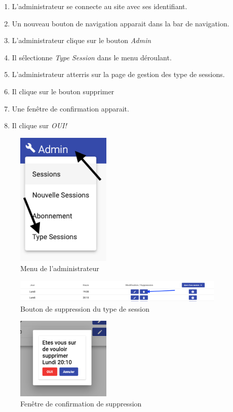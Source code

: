 \begin{enumerate}
	\item L'administrateur se connecte au site avec ses identifiant. 
	\item Un nouveau bouton de navigation apparait dans la bar de navigation. 
	\item L'administrateur clique sur le bouton \textit{Admin}
	\item Il sélectionne \textit{Type Session} dans le menu déroulant. 
	\item L'administrateur atterris sur la page de gestion des type de sessions. 
	\item Il clique sur le bouton supprimer
	\item Une fenêtre de confirmation apparait. 
	\item Il clique sur \textit{OUI!} 
\end{enumerate}

\newpage
\begin{figure}[h]
	\includegraphics[width=0.4\textwidth,center]{Figures/us13-1}
	\caption{Menu de l'administrateur}
\end{figure}

\vspace{\baselineskip}
\begin{figure}[h]
	\includegraphics[width=0.9\textwidth,center]{Figures/us14-1}
	\caption{Bouton de suppression du type de session}
\end{figure}

\newpage
\begin{figure}[h]
	\includegraphics[width=0.4\textwidth,center]{Figures/us14-2}
	\caption{Fenêtre de confirmation de suppression}
\end{figure}
